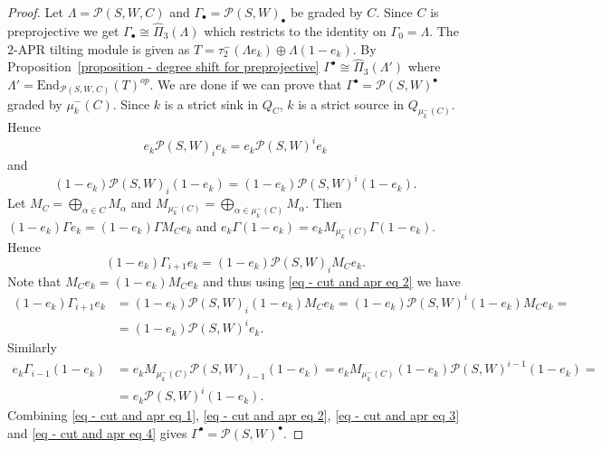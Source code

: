 \documentclass[10pt,a4paper]{amsart}
\begin{document}
\begin{proof}
	Let $\Lambda = \mathcal{P}(S, W, C)$ and $\Gamma_\bullet = \mathcal{P}(S, W)_\bullet$ be graded by $C$. Since $C$ is preprojective we get $\Gamma_\bullet \cong \widehat{\Pi}_3(\Lambda)$ which restricts to the identity on $\Gamma_0 = \Lambda$. The $2$-APR tilting module is given as $T = \tau_2^-(\Lambda e_k)\oplus \Lambda(1- e_k)$. By Proposition~\ref{proposition - degree shift for preprojective} $\Gamma^\bullet \cong \widehat{\Pi}_3(\Lambda')$ where $\Lambda' = \mathrm{End}_{\mathcal{P}(S, W, C)}(T)^{op}$. We are done if we can prove that $\Gamma^\bullet = \mathcal{P}(S, W)^\bullet$ graded by $\mu_k^-(C)$. Since $k$ is a strict sink in $Q_C$, $k$ is a strict source in $Q_{\mu_k^-(C)}$. Hence
	\begin{equation}\label{eq - cut and apr eq 1}
		e_k\mathcal{P}(S, W)_ie_k = e_k\mathcal{P}(S, W)^ie_k
	\end{equation}
	and
	\begin{equation}\label{eq - cut and apr eq 2}
		(1-e_k)\mathcal{P}(S, W)_i(1- e_k) = (1-e_k)\mathcal{P}(S, W)^i(1- e_k).
	\end{equation}
	Let $M_C = \bigoplus_{\alpha\in C}M_\alpha$ and $M_{\mu_k^-(C)} = \bigoplus_{\alpha\in \mu_k^-(C)}M_\alpha$. Then $(1- e_k)\Gamma e_k = (1-e_k)\Gamma M_C e_k$ and $e_k \Gamma(1- e_k) = e_k M_{\mu_k^-(C)}\Gamma(1-e_k)$. Hence
	\begin{equation*}
		(1-e_k)\Gamma_{i+1}e_k = (1-e_k)\mathcal{P}(S, W)_iM_C e_k.
	\end{equation*}
	Note that $M_C e_k = (1-e_k)M_C e_k$ and thus using \eqref{eq - cut and apr eq 2} we have
	\begin{equation}\label{eq - cut and apr eq 3}
		\begin{aligned}
			(1-e_k)\Gamma_{i+1}e_k &= (1-e_k)\mathcal{P}(S, W)_i(1-e_k)M_C e_k = (1-e_k)\mathcal{P}(S, W)^i(1- e_k)M_C e_k = \\
			&= (1-e_k)\mathcal{P}(S, W)^i e_k.
		\end{aligned}
	\end{equation}
	Similarly
	\begin{equation}\label{eq - cut and apr eq 4}
		\begin{aligned}
			e_k \Gamma_{i-1}(1-e_k) &= e_k M_{\mu_k^-(C)} \mathcal{P}(S, W)_{i-1} (1-e_k) = e_k M_{\mu_k^-(C)}(1-e_k) \mathcal{P}(S, W)^{i-1}(1-e_k) = \\
			&= e_k \mathcal{P}(S, W)^{i}(1-e_k).
		\end{aligned}
	\end{equation}
	Combining \eqref{eq - cut and apr eq 1}, \eqref{eq - cut and apr eq 2}, \eqref{eq - cut and apr eq 3} and \eqref{eq - cut and apr eq 4} gives $\Gamma^\bullet = \mathcal{P}(S, W)^\bullet$.
\end{proof}
\end{document}
